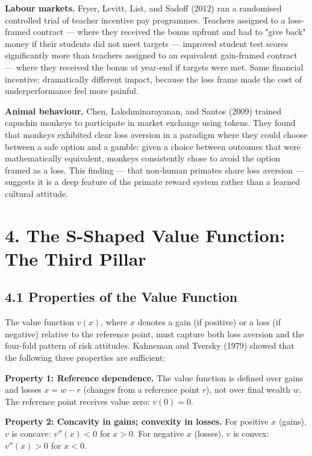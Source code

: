 \documentclass[12pt, letterpaper]{article}
\begin{document}
\textbf{Labour markets.} Fryer, Levitt, List, and Sadoff (2012) ran a randomised controlled trial of teacher incentive pay programmes. Teachers assigned to a loss-framed contract --- where they received the bonus upfront and had to "give back" money if their students did not meet targets --- improved student test scores significantly more than teachers assigned to an equivalent gain-framed contract --- where they received the bonus at year-end if targets were met. Same financial incentive; dramatically different impact, because the loss frame made the cost of underperformance feel more painful.

\textbf{Animal behaviour.} Chen, Lakshminarayanan, and Santos (2009) trained capuchin monkeys to participate in market exchange using tokens. They found that monkeys exhibited clear loss aversion in a paradigm where they could choose between a safe option and a gamble: given a choice between outcomes that were mathematically equivalent, monkeys consistently chose to avoid the option framed as a loss. This finding --- that non-human primates share loss aversion --- suggests it is a deep feature of the primate reward system rather than a learned cultural attitude.

\medskip


\section{4. The S-Shaped Value Function: The Third Pillar}



\subsection{4.1 Properties of the Value Function}


The value function $v(x)$, where $x$ denotes a gain (if positive) or a loss (if negative) relative to the reference point, must capture both loss aversion and the four-fold pattern of risk attitudes. Kahneman and Tversky (1979) showed that the following three properties are sufficient:

\textbf{Property 1: Reference dependence.} The value function is defined over gains and losses $x = w - r$ (changes from a reference point $r$), not over final wealth $w$. The reference point receives value zero: $v(0) = 0$.

\textbf{Property 2: Concavity in gains; convexity in losses.} For positive $x$ (gains), $v$ is concave: $v''(x) < 0$ for $x > 0$. For negative $x$ (losses), $v$ is convex: $v''(x) > 0$ for $x < 0$.
\end{document}
